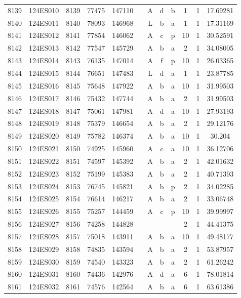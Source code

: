 \begin{tabular}{|*{12}{c|}}
8139 & 124ES010 & 8139 & 77475 & 147110 &  & A & d & b & 1 & 1 & 17.69281 \\ 
8140 & 124ES011 & 8140 & 78093 & 146968 &  & L & b & a & 1 & 1 & 17.31169 \\ 
8141 & 124ES012 & 8141 & 77854 & 146062 &  & A & c & p & 10 & 1 & 30.52591 \\ 
8142 & 124ES013 & 8142 & 77547 & 145729 &  & A & b & a & 2 & 1 & 34.08005 \\ 
8143 & 124ES014 & 8143 & 76135 & 147014 &  & A & f & p & 10 & 1 & 26.03365 \\ 
8144 & 124ES015 & 8144 & 76651 & 147483 &  & L & d & a & 1 & 1 & 23.87785 \\ 
8145 & 124ES016 & 8145 & 75648 & 147922 &  & A & b & a & 10 & 1 & 31.99503 \\ 
8146 & 124ES017 & 8146 & 75432 & 147744 &  & A & b & a & 2 & 1 & 31.99503 \\ 
8147 & 124ES018 & 8147 & 75061 & 147981 &  & A & d & a & 10 & 1 & 27.93193 \\ 
8148 & 124ES019 & 8148 & 75379 & 146654 &  & A & b & a & 2 & 1 & 29.12176 \\ 
8149 & 124ES020 & 8149 & 75782 & 146374 &  & A & b & a & 10 & 1 & 30.204 \\ 
8150 & 124ES021 & 8150 & 74925 & 145960 &  & A & c & a & 10 & 1 & 36.12706 \\ 
8151 & 124ES022 & 8151 & 74597 & 145392 &  & A & b & a & 2 & 1 & 42.01632 \\ 
8152 & 124ES023 & 8152 & 75199 & 145383 &  & A & b & a & 2 & 1 & 40.71393 \\ 
8153 & 124ES024 & 8153 & 76745 & 145821 &  & A & b & p & 2 & 1 & 34.02285 \\ 
8154 & 124ES025 & 8154 & 76614 & 146217 &  & A & b & a & 2 & 1 & 33.06748 \\ 
8155 & 124ES026 & 8155 & 75257 & 144459 &  & A & c & p & 10 & 1 & 39.99997 \\ 
8156 & 124ES027 & 8156 & 74258 & 144828 &  &  &  &  & 2 & 1 & 44.41375 \\ 
8157 & 124ES028 & 8157 & 75018 & 143911 &  & A & b & a & 10 & 1 & 49.48177 \\ 
8158 & 124ES029 & 8158 & 74835 & 143594 &  & A & b & a & 2 & 1 & 53.87957 \\ 
8159 & 124ES030 & 8159 & 74540 & 143323 &  & A & b & a & 2 & 1 & 61.26242 \\ 
8160 & 124ES031 & 8160 & 74436 & 142976 &  & A & d & a & 6 & 1 & 78.01814 \\ 
8161 & 124ES032 & 8161 & 74576 & 142564 &  & A & b & a & 6 & 1 & 63.61386 \\ 

\end{tabular}
